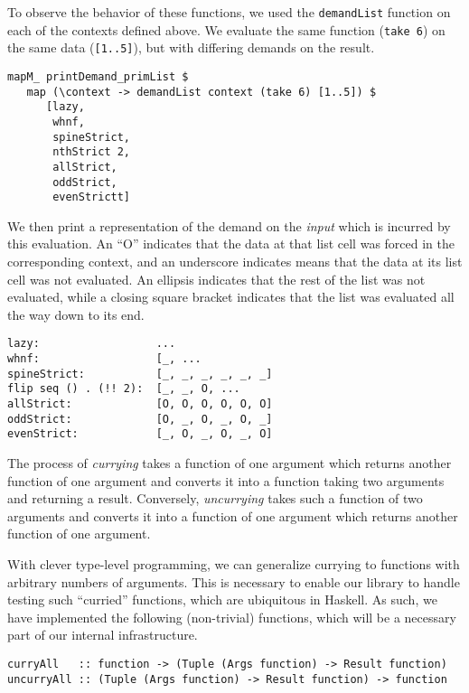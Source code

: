 \documentclass{article}
\begin{document}
To observe the behavior of these functions, we used the \verb|demandList|
function on each of the contexts defined above. We evaluate the same function
(\verb|take 6|) on the same data (\verb|[1..5]|), but with differing demands on
the result.

\begin{verbatim}
mapM_ printDemand_primList $
   map (\context -> demandList context (take 6) [1..5]) $
      [lazy,
       whnf,
       spineStrict,
       nthStrict 2,
       allStrict,
       oddStrict,
       evenStrictt]
\end{verbatim}

We then print a representation of the demand on the \emph{input} which is
incurred by this evaluation. An ``O'' indicates that the data at
that list cell was forced in the corresponding context, and an underscore
indicates means that the data at its list cell was not evaluated. An ellipsis
indicates that the rest of the list was not evaluated, while a closing square
bracket indicates that the list was evaluated all the way down to its end.

\begin{verbatim}
lazy:                  ...
whnf:                  [_, ...
spineStrict:           [_, _, _, _, _, _]
flip seq () . (!! 2):  [_, _, O, ...
allStrict:             [O, O, O, O, O, O]
oddStrict:             [O, _, O, _, O, _]
evenStrict:            [_, O, _, O, _, O]
\end{verbatim}

The process of \emph{currying} takes a function of one argument which returns another function of one argument and converts it into a function taking two arguments and returning a result. Conversely, \emph{uncurrying} takes such a function of two arguments and converts it into a function of one argument which returns another function of one argument.

With clever type-level programming, we can generalize currying to functions with arbitrary numbers of arguments. This is necessary to enable our library to handle testing such ``curried'' functions, which are ubiquitous in Haskell. As such, we have implemented the following (non-trivial) functions, which will be a necessary part of our internal infrastructure.

\begin{verbatim}
curryAll   :: function -> (Tuple (Args function) -> Result function)
uncurryAll :: (Tuple (Args function) -> Result function) -> function
\end{verbatim}
\end{document}

